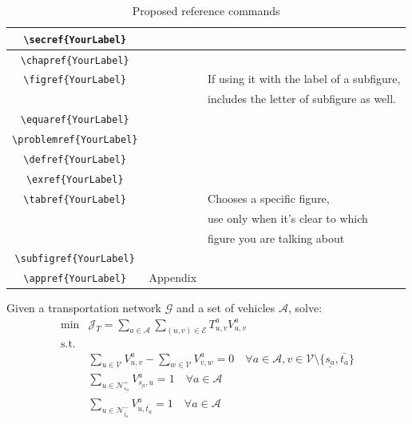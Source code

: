\begin{table}[h]
	\centering
	\begin{tabular}{|c|c|l|}
		\hline
		\texttt{\textbackslash secref\{YourLabel\}} & \secref{sec:general_definitions} &  \\ \hline
		\texttt{\textbackslash chapref\{YourLabel\}} & \chapref{chap:how_tos} &  \\ \hline
		\texttt{\textbackslash figref\{YourLabel\}} & \figref{fig:nyc_rn} &If using it with the label of a subfigure, \\&&includes the letter of subfigure as well.\\ \hline
		\texttt{\textbackslash equaref\{YourLabel\}} & \equaref{eq:equation_test} &  \\ \hline
		\texttt{\textbackslash problemref\{YourLabel\}} & \problemref{prob:example} &  \\ \hline
		\texttt{\textbackslash defref\{YourLabel\}} & {def:positive_semidefinite} &  \\ \hline
		\texttt{\textbackslash exref\{YourLabel\}} & \exref{ex:example} &  \\ \hline
		\texttt{\textbackslash tabref\{YourLabel\}} &  \tabref{tab:ref_commands} & Chooses a specific figure, \\&&use only when it's clear to which \\&&figure you are talking about \\ \hline
		\texttt{\textbackslash subfigref\{YourLabel\}} & \subfigref{fig:nyc_simplified_roads} &  \\ \hline
		\texttt{\textbackslash appref\{YourLabel\}} & Appendix &  \\ \hline
	\end{tabular}
	\caption{Proposed reference commands}\label{tab:ref_commands}
\end{table}



\begin{problem}\label{prob:example} 
	Given a transportation network $\mathcal{G}$ and a set of vehicles $\mathcal{A}$, solve:
	\begin{align}
		\text{min}& 
		\mathcal{J}_T = \sum_{a \in \mathcal{A}} \sum_{(u, v) \in \mathcal{E}} T^a_{ u,v} V^a_{u,v}
		\nonumber\\
		\text{s.t.} &\nonumber\\
		&\sum_{u \in \mathcal{V}} V^a_{u, v} - \sum_{w \in \mathcal{V}} V^a_{v, w} = 0 \quad \forall a \in \mathcal{A}, v \in \mathcal{V} \setminus \{\underline{s_a}, \bar{t_a}\} \label{eq:flow_conservation_graph_u} \\
		&\sum_{ u \in \mathcal{N}^+_{\underline{s_a}} }V^a_{ \underline{s_a},u} = 1 \quad \forall a \in \mathcal{A} \label{eq:flow_cons_arrival_graph_u}\\
		&\sum_{u \in \mathcal{N}^-_{\bar{t_a}} } V^a_{u, \bar{t_a}} = 1 \quad \forall a \in \mathcal{A} \label{eq:flow_cons_departure_graph_u}\\
		\nonumber
	\end{align}
\end{problem}

